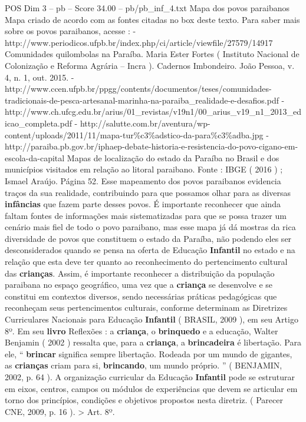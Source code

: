 \begin{textsample}{POS Dim 3 – pb – Score 34.00 – pb/pb\_inf\_4.txt}
Mapa dos povos paraibanos Mapa criado de acordo com as fontes citadas no box deste texto.
Para saber mais sobre os povos paraibanos, acesse : - http://www.periodicos.ufpb.br/index.php/ci/article/viewfile/27579/14917 Comunidades quilombolas na Paraíba.
Maria Ester Fortes ( Instituto Nacional de Colonização e Reforma Agrária – Incra ).
Cadernos Imbondeiro.
João Pessoa, v. 4, n. 1, out. 2015. - http://www.ccen.ufpb.br/ppgg/contents/documentos/teses/comunidades-tradicionais-de-pesca-artesanal-marinha-na-paraiba\_realidade-e-desafios.pdf - http://www.ch.ufcg.edu.br/arius/01\_revistas/v19n1/00\_arius\_v19\_n1\_2013\_edicao\_completa.pdf - http://salutte.com.br/aventura/wp-content/uploads/2011/11/mapa-tur\%c3\%adstico-da-para\%c3\%adba.jpg - http://paraiba.pb.gov.br/iphaep-debate-historia-e-resistencia-do-povo-cigano-em-escola-da-capital Mapas de localização do estado da Paraíba no Brasil e dos municípios visitados em relação ao litoral paraibano.
Fonte : IBGE ( 2016 ) ; Ismael Araújo.
Página 52.
Esse mapeamento dos povos paraibanos evidencia traços da sua realidade, contribuindo para que possamos olhar para as diversas \textbf{infâncias} que fazem parte desses povos.
É importante reconhecer que ainda faltam fontes de informações mais sistematizadas para que se possa trazer um cenário mais fiel de todo o povo paraibano, mas esse mapa já dá mostras da rica diversidade de povos que constituem o estado da Paraíba, não podendo eles ser desconsiderados quando se pensa na oferta de Educação \textbf{Infantil} no estado e na relação que esta deve ter quanto ao reconhecimento do pertencimento cultural das \textbf{crianças}.
Assim, é importante reconhecer a distribuição da população paraibana no espaço geográfico, uma vez que a \textbf{criança} se desenvolve e se constitui em contextos diversos, sendo necessárias práticas pedagógicas que reconheçam seus pertencimentos culturais, conforme determinam as Diretrizes Curriculares Nacionais para Educação \textbf{Infantil} ( BRASIL, 2009 ), em seu Artigo 8º.
Em seu \textbf{livro} Reflexões : a \textbf{criança}, o \textbf{brinquedo} e a educação, Walter Benjamin ( 2002 ) ressalta que, para a \textbf{criança}, a \textbf{brincadeira} é libertação.
Para ele, “ \textbf{brincar} significa sempre libertação.
Rodeada por um mundo de gigantes, as \textbf{crianças} criam para si, \textbf{brincando}, um mundo próprio. ” ( BENJAMIN, 2002, p. 64 ).
A organização curricular da Educação \textbf{Infantil} pode se estruturar em eixos, centros, campos ou módulos de experiências que devem se articular em torno dos princípios, condições e objetivos propostos nesta diretriz. ( Parecer CNE, 2009, p. 16 ). > Art. 8º.

\end{textsample}
